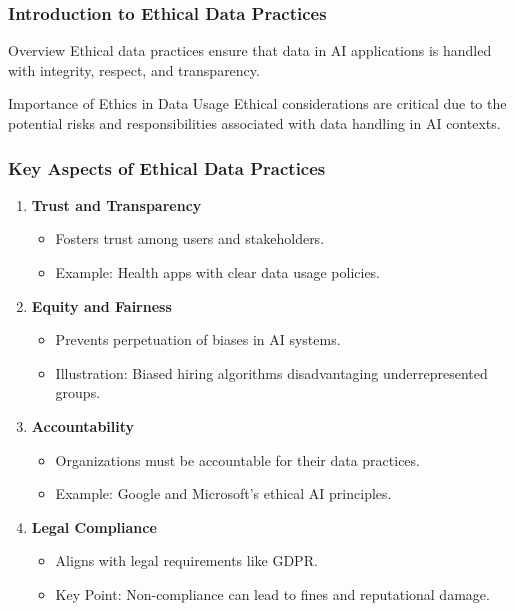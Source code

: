 \documentclass[aspectratio=169]{beamer}
\begin{document}
\frame{\titlepage}

\begin{frame}[fragile]
    \frametitle{Introduction to Ethical Data Practices}
    
    \begin{block}{Overview}
        Ethical data practices ensure that data in AI applications is handled with integrity, respect, and transparency.
    \end{block}
    
    \begin{block}{Importance of Ethics in Data Usage}
        Ethical considerations are critical due to the potential risks and responsibilities associated with data handling in AI contexts.
    \end{block}
\end{frame}

\begin{frame}[fragile]
    \frametitle{Key Aspects of Ethical Data Practices}
    
    \begin{enumerate}
        \item \textbf{Trust and Transparency}
            \begin{itemize}
                \item Fosters trust among users and stakeholders.
                \item Example: Health apps with clear data usage policies.
            \end{itemize}
        
        \item \textbf{Equity and Fairness}
            \begin{itemize}
                \item Prevents perpetuation of biases in AI systems.
                \item Illustration: Biased hiring algorithms disadvantaging underrepresented groups.
            \end{itemize}

        \item \textbf{Accountability}
            \begin{itemize}
                \item Organizations must be accountable for their data practices.
                \item Example: Google and Microsoft's ethical AI principles.
            \end{itemize}

        \item \textbf{Legal Compliance}
            \begin{itemize}
                \item Aligns with legal requirements like GDPR.
                \item Key Point: Non-compliance can lead to fines and reputational damage.
            \end{itemize}
    \end{enumerate}
\end{frame}
\end{document}
